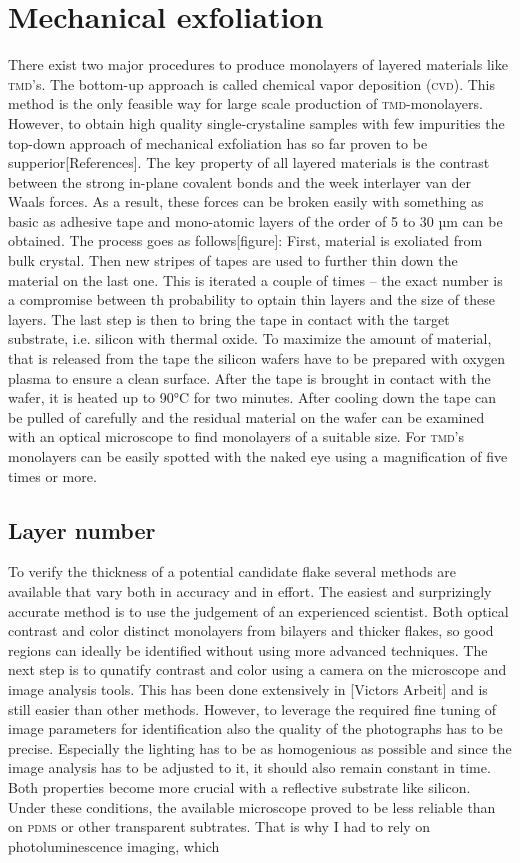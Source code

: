 \section{Mechanical exfoliation}

There exist two major procedures to produce monolayers of layered materials like \textsc{tmd}'s. The bottom-up approach is called chemical vapor deposition (\textsc{cvd}). This method is the only feasible way for large scale production of \textsc{tmd}-monolayers. However, to obtain high quality single-crystaline samples with few impurities the top-down approach of mechanical exfoliation has so far proven to be supperior[References]. The key property of all layered materials is the contrast between the strong in-plane covalent bonds and the week interlayer van der Waals forces. As a result, these forces can be broken easily with something as basic as adhesive tape and mono-atomic layers of the order of 5 to 30 µm can be obtained. The process goes as follows[figure]: First, material is exoliated from bulk crystal. Then new stripes of tapes are used to further thin down the material on the last one. This is iterated a couple of times -- the exact number is a compromise between th probability to optain thin layers and the size of these layers. The last step is then to bring the tape in contact with the target substrate, i.e. silicon with thermal oxide. To maximize the amount of material, that is released from the tape the silicon wafers have to be prepared with oxygen plasma to ensure a clean surface. After the tape is brought in contact with the wafer, it is heated up to 90°C for two minutes. After cooling down the tape can be pulled of carefully and the residual material on the wafer can be examined with an optical microscope to find monolayers of a suitable size. For \textsc{tmd}'s monolayers can be easily spotted with the naked eye using a magnification of five times or more.

\subsection{Layer number}

To verify the thickness of a potential candidate flake several methods are available that vary both in accuracy and in effort. The easiest and surprizingly accurate method is to use the judgement of an experienced scientist. Both optical contrast and color distinct monolayers from bilayers and thicker flakes, so good regions can ideally be identified without using more advanced techniques. The next step is to qunatify contrast and color using a camera on the microscope and image analysis tools. This has been done extensively in [Victors Arbeit] and is still easier than other methods. However, to leverage the required fine tuning of image parameters for identification also the quality of the photographs has to be precise. Especially the lighting has to be as homogenious as possible and since the image analysis has to be adjusted to it, it should also remain constant in time. Both properties become more crucial with a reflective substrate like silicon. Under these conditions, the available microscope proved to be less reliable than on \textsc{pdms} or other transparent subtrates. That is why I had to rely on photoluminescence imaging, which 